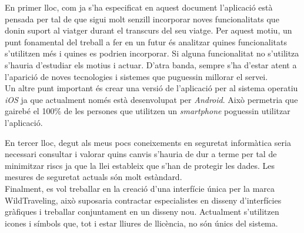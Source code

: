 En primer lloc, com ja s'ha especificat en aquest document l'aplicació està pensada per tal de que sigui molt senzill incorporar noves funcionalitats que donin suport al viatger durant el transcurs del seu viatge. Per aquest motiu, un punt fonamental del treball a fer en un futur és analitzar quines funcionalitats s'utilitzen més i quines es podrien incorporar. Si alguna funcionalitat no s'utilitza s'hauria d'estudiar els motius i actuar. D'atra banda, sempre s'ha d'estar atent a l'aparició de noves tecnologies i sistemes que puguessin millorar el servei.\\

Un altre punt important és crear una versió de l'aplicació per al sistema operatiu \textit{iOS} ja que actualment només està desenvolupat per \textit{Android}. Això permetria que gairebé el 100\% de les persones que utilitzen un \textit{smartphone} poguessin utilitzar l'aplicació.\\

\clearpage

En tercer lloc, degut als meus pocs coneixements en seguretat informàtica seria necessari consultar i valorar quins canvis s'hauria de dur a terme per tal de minimitzar riscs ja que la llei estableix que s'han de protegir les dades. Les mesures de seguretat actuals són molt estàndard.\\


Finalment, es vol treballar en la creació d'una interfície única per la marca WildTraveling, això suposaria contractar especialistes en disseny d'interfícies gràfiques i treballar conjuntament en un disseny nou. Actualment s'utilitzen icones i símbols que, tot i estar lliures de llicència, no són únics del sistema.


